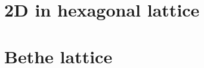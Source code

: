 \begin{figure}[h]

\centering%
\end{figure}








\section{2D in hexagonal lattice}


\section{Bethe lattice}\label{sec:bethelattice}







